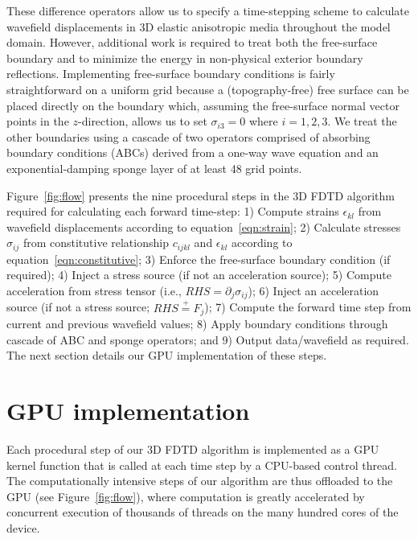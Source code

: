 
These difference operators allow us to specify a time-stepping scheme to calculate wavefield displacements in 3D elastic anisotropic media throughout the model domain.  However, additional work is required to treat both the free-surface boundary and to minimize the energy in non-physical exterior boundary reflections.  Implementing free-surface boundary conditions is fairly straightforward on a uniform grid because a (topography-free) free surface can be placed directly on the boundary which, assuming the free-surface normal vector points in the $z$-direction, allows us to set $\sigma_{i3}=0$ where $i=1,2,3$.  We treat the other boundaries using a cascade of two operators comprised of absorbing boundary conditions (ABCs) derived from a one-way wave equation \cite[]{Clayton} and an exponential-damping sponge layer \cite[]{Cerjan} of at least 48 grid points. 

Figure~\ref{fig:flow} presents the nine procedural steps in the 3D FDTD algorithm required for calculating each forward time-step: 1) Compute strains $\epsilon_{kl}$ from wavefield displacements according to equation~\ref{eqn:strain}; 2) Calculate stresses $\sigma_{ij}$ from constitutive relationship $c_{ijkl}$ and $\epsilon_{kl}$ according to equation~\ref{eqn:constitutive}; 3) Enforce the free-surface boundary condition (if required); 4) Inject a stress source (if not an acceleration source); 5) Compute acceleration from stress tensor (i.e., $RHS = \partial_j \sigma_{ij}$); 6) Inject an acceleration source (if not a stress source; $RHS \stackrel{+}{=} F_{j}$); 7) Compute the forward time step from current and previous wavefield values; 8) Apply boundary conditions through cascade of ABC and sponge operators; and 9) Output data/wavefield as required.  The next section details our GPU implementation of these steps.


\section {GPU implementation}

Each procedural step of our 3D FDTD algorithm is implemented as a GPU kernel function that is called at each time step by a CPU-based control thread.  The computationally intensive steps of our algorithm are thus offloaded to the GPU (see Figure~\ref{fig:flow}), where computation is greatly accelerated by concurrent execution of thousands of threads on the many hundred cores of the device.  

